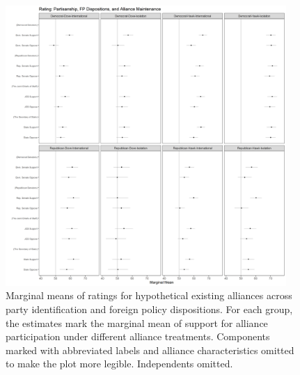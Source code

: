 \documentclass[12pt]{article}
\begin{document}
\begin{figure}
	\centering
		\includegraphics[width=0.95\textwidth]{party-dispo-mainapp.png}
	\caption{Marginal means of ratings for hypothetical existing alliances across party identification and foreign policy dispositions. For each group, the estimates mark the marginal mean of support for alliance participation under different alliance treatments. Components marked with abbreviated labels and alliance characteristics omitted to make the plot more legible. Independents omitted.}
	\label{fig:party-dispo-main}
\end{figure}


\newpage 
\end{document}
